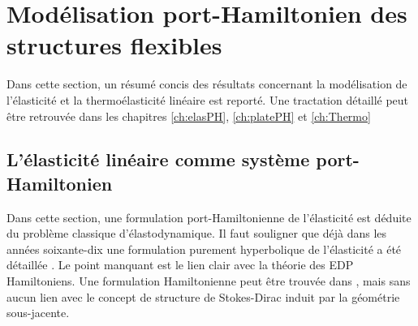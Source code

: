 \section{Mod\'elisation port-Hamiltonien des structures flexibles}
Dans cette section, un résumé concis des résultats concernant la modélisation de l'élasticité et la thermoélasticité linéaire est reporté. Une tractation détaillé peut être retrouvée dans les chapitres \ref{ch:elasPH}, \ref{ch:platePH} et \ref{ch:Thermo}


\subsection*{L'élasticité linéaire comme système port-Hamiltonien}

Dans cette section, une formulation port-Hamiltonienne de l'élasticité est déduite du problème classique d'élastodynamique. Il faut souligner que déjà dans les années soixante-dix une formulation purement hyperbolique de l'élasticité a été détaillée \cite{hughes1978classical}. Le point manquant est le lien clair avec la théorie des EDP Hamiltoniens. Une formulation Hamiltonienne peut être trouvée dans \cite[Chapitre 16]{grinfield2015}, mais sans aucun lien avec le concept de structure de Stokes-Dirac induit par la géométrie sous-jacente. \\


